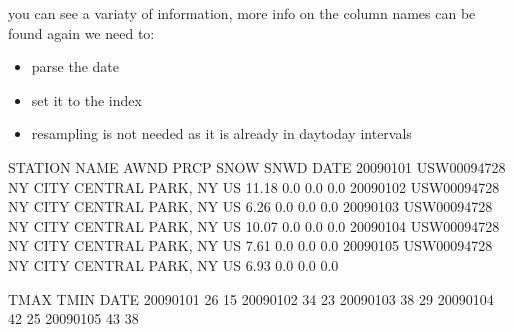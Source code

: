 \documentclass[letterpaper,10pt,english]{jupyterBook}
\begin{document}
\sphinxAtStartPar
you can see a variaty of information, more info on the column names can be found again we need to:
\begin{itemize}
\item {} 
\sphinxAtStartPar
parse the date

\item {} 
\sphinxAtStartPar
set it to the index

\item {} 
\sphinxAtStartPar
resampling is not needed as it is already in day\sphinxhyphen{}to\sphinxhyphen{}day intervals

\end{itemize}

\begin{sphinxVerbatim}[commandchars=\\\{\}]
\PYG{p}{[}\PYG{p}{]}   \PYG{p}{[}\PYG{p}{]} 
  
\end{sphinxVerbatim}

\begin{sphinxVerbatim}[commandchars=\\\{\}]
\end{sphinxVerbatim}

\begin{sphinxVerbatim}[commandchars=\\\{\}]
                STATION                         NAME   AWND  PRCP  SNOW  SNWD  \PYGZbs{}
DATE                                                                            
2009\PYGZhy{}01\PYGZhy{}01  USW00094728  NY CITY CENTRAL PARK, NY US  11.18   0.0   0.0   0.0   
2009\PYGZhy{}01\PYGZhy{}02  USW00094728  NY CITY CENTRAL PARK, NY US   6.26   0.0   0.0   0.0   
2009\PYGZhy{}01\PYGZhy{}03  USW00094728  NY CITY CENTRAL PARK, NY US  10.07   0.0   0.0   0.0   
2009\PYGZhy{}01\PYGZhy{}04  USW00094728  NY CITY CENTRAL PARK, NY US   7.61   0.0   0.0   0.0   
2009\PYGZhy{}01\PYGZhy{}05  USW00094728  NY CITY CENTRAL PARK, NY US   6.93   0.0   0.0   0.0   

            TMAX  TMIN  
DATE                    
2009\PYGZhy{}01\PYGZhy{}01    26    15  
2009\PYGZhy{}01\PYGZhy{}02    34    23  
2009\PYGZhy{}01\PYGZhy{}03    38    29  
2009\PYGZhy{}01\PYGZhy{}04    42    25  
2009\PYGZhy{}01\PYGZhy{}05    43    38  
\end{sphinxVerbatim}
\end{document}
